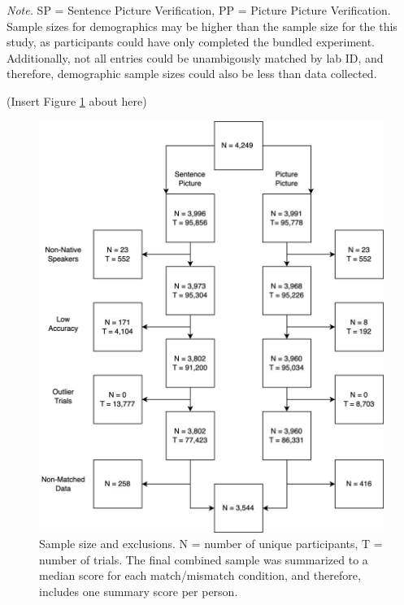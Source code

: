 \documentclass[
  man,floatsintext]{apa7}
\begin{document}
\begin{table}[tbp]
\begin{center}
\begin{threeparttable}
{}

\begin{tablenotes}[para]
\normalsize{\textit{Note.} SP = Sentence Picture Verification, PP = Picture Picture Verification. Sample sizes for demographics may be higher than the sample size for the this study, as participants could have only completed the bundled experiment. Additionally, not all entries could be unambigously matched by lab ID, and therefore, demographic sample sizes could also be less than data collected.}
\end{tablenotes}

\end{threeparttable}
\end{center}

\end{table}

(Insert Figure \ref{fig:sample-fig} about here)

\begin{figure}
\centering
\includegraphics{includes/fig/psa002_flow.drawio.png}
\caption{\label{fig:sample-fig}Sample size and exclusions. N = number of unique participants, T = number of trials. The final combined sample was summarized to a median score for each match/mismatch condition, and therefore, includes one summary score per person.}
\end{figure}
\end{document}
